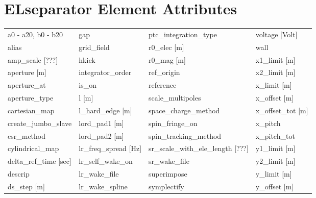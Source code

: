  \section{ELseparator Element Attributes}
 \label{s:list.elseparator}
 
 \begin{tabular}{llll} \toprule
a0 - a20, b0 - b20             & gap                            & ptc_integration_type           & voltage [Volt]                 \\
alias                          & grid_field                     & r0_elec [m]                    & wall                           \\
amp_scale [???]                & hkick                          & r0_mag [m]                     & x1_limit [m]                   \\
aperture [m]                   & integrator_order               & ref_origin                     & x2_limit [m]                   \\
aperture_at                    & is_on                          & reference                      & x_limit [m]                    \\
aperture_type                  & l [m]                          & scale_multipoles               & x_offset [m]                   \\
cartesian_map                  & l_hard_edge [m]                & space_charge_method            & x_offset_tot [m]               \\
create_jumbo_slave             & lord_pad1 [m]                  & spin_fringe_on                 & x_pitch                        \\
csr_method                     & lord_pad2 [m]                  & spin_tracking_method           & x_pitch_tot                    \\
cylindrical_map                & lr_freq_spread [Hz]            & sr_scale_with_ele_length [???] & y1_limit [m]                   \\
delta_ref_time [sec]           & lr_self_wake_on                & sr_wake_file                   & y2_limit [m]                   \\
descrip                        & lr_wake_file                   & superimpose                    & y_limit [m]                    \\
ds_step [m]                    & lr_wake_spline                 & symplectify                    & y_offset [m]                   \\

\end{tabular}

